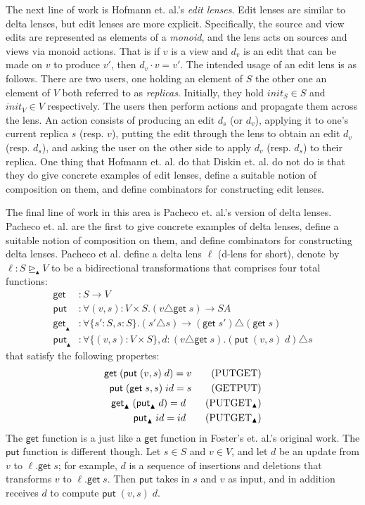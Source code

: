 \documentclass[acmsmall,review,anonymous]{acmart}\settopmatter{printfolios=true,printccs=false,printacmref=false}
\theoremstyle{definition}
\newcommand{\kw}[1]{\ensuremath{\mathsf{#1}}\xspace}
\newcommand{\get}{\ensuremath{\kw{get}}\xspace}
\newcommand{\pput}{\ensuremath{\kw{put}}\xspace}
\begin{document}
The next line of work is Hofmann et. al.'s {\em edit
lenses}\cite{hofmann2012edit}. Edit lenses are similar to delta lenses, but edit
lenses are more explicit. Specifically, the source and view edits are
represented as elements of a {\em monoid}, and the lens acts on sources and
views via monoid actions. That is if $v$ is a view and $d_v$ is an edit that
can be made on $v$ to produce $v'$, then $d_v \cdot v = v'$. The intended usage
of an edit lens is as follows. There are two users, one holding an element of
$S$ the other one an element of $V$ both referred to as {\em replicas}.
Initially, they hold $init_S \in S$ and $init_V \in V$ respectively. The users
then perform actions and propagate them across the lens. An action consists of
producing an edit $d_s$ (or $d_v$), applying it to one's current replica $s$
(resp. $v$), putting the edit through the lens to obtain an edit $d_v$ (resp.
$d_s$), and asking the user on the other side to apply $d_v$ (resp. $d_s$) to
their replica. One thing that Hofmann et. al. do that Diskin et. al. do not do
is that they do give concrete examples of edit lenses, define a suitable notion
of composition on them, and define combinators for constructing edit lenses.

The final line of work in this area is Pacheco et. al.'s
version of delta lenses\cite{pacheco2012delta}. Pacheco et. al. are the
first to give concrete examples of delta lenses, define a suitable notion
of composition on them, and define combinators for constructing delta
lenses. Pacheco et al. define a delta lens $\ell$ (d-lens for short), denote by
$\ell: S \trianglerighteq_{\blacktriangle} V$ to be a bidirectional
transformations that comprises four total functions:
\begin{align*}
\get &: S \longrightarrow V\\
\pput &: \forall(v, s) : V \times S. (v \triangle \get \;s) \longrightarrow
SA\\
\get_{\blacktriangle} &: \forall\{s':S, s:S\}. (s' \triangle s)
\longrightarrow (\get \; s')\triangle (\get \; s)\\
\pput_{\blacktriangle} &:\forall\{(v, s):V \times S\},d:(v \triangle \get
\;s).(\pput \; (v, s) \; d) \triangle s
\end{align*}
that satisfy the following propertes:
\begin{align*}
\get \; (\pput \; (v, s) \; d) = v \tag{PUTGET}\\
\pput \; (\get \; s, s) \; id = s \tag{GETPUT}\\
\get_{\blacktriangle} \; (\pput_{\blacktriangle} \; d) = d
\tag{$\text{PUTGET}_{\blacktriangle}$}\\
\pput_{\blacktriangle} \; id = id \tag{$\text{PUTGET}_{\blacktriangle}$}
\end{align*}
The \get function is a just like a \get function in Foster's et. al.'s original
work. The \pput function is different though. Let $s \in S$ and $v \in V$, and
let $d$ be an update from $v$ to $\ell.\get \; s$; for example, $d$ is a
sequence of insertions and deletions that transforms $v$ to $\ell.\get \; s$.
Then \pput takes in $s$ and $v$ as input, and in addition receives $d$ to
compute $\pput \; (v, s) \; d$.
\end{document}
